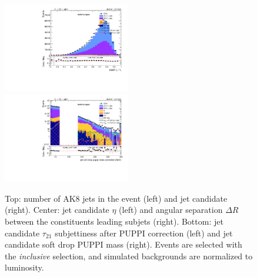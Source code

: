 \begin{figure}[!htb]
\begin{center}
    \includegraphics[width=0.495\textwidth]{plots/v9_thesis/XVZnnInc/FatJet1_puppiTau21.pdf}
    \includegraphics[width=0.495\textwidth]{plots/v9_thesis/XVZnnInc/FatJet1_softdropPuppiMassCorr.pdf}

    \caption{Top: number of AK8 jets in the event (left) and \V jet candidate \pt (right). Center: \V jet candidate $\eta$ (left) and angular separation $\Delta R$ between the constituents leading subjets (right). Bottom: \V jet candidate $\tau_{21}$ subjettiness after PUPPI correction (left) and \V jet candidate soft drop PUPPI mass (right). Events are selected with the \emph{inclusive} selection, and simulated backgrounds are normalized to luminosity.}
\label{fig:plot_uno}
  \end{center}
\end{figure}

\clearpage

